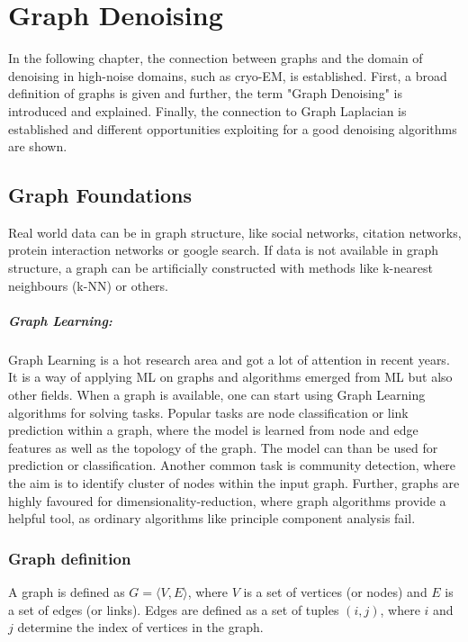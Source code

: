 \chapter{Graph Denoising}
\label{sec:graphDenoising}
    

In the following chapter, the connection between graphs and the domain of denoising in high-noise 
domains, such as cryo-EM, is established.
First, a broad definition of graphs is given and further, the term "Graph Denoising" is
introduced and explained. Finally, the connection to Graph Laplacian is established
and different opportunities exploiting for a good denoising algorithms are shown.


\section{Graph Foundations}
Real world data can be in graph structure, like social networks, citation networks,
protein interaction networks or google search. 
If data is not available in graph structure, a graph can be artificially constructed with methods like k-nearest neighbours (k-NN) or others.

\paragraph{Graph Learning:} Graph Learning is a hot research area and got a lot of attention in recent years.
It is a way of applying ML on graphs and algorithms emerged from ML but also other fields.
When a graph is available, one can start using Graph Learning algorithms for solving tasks.
Popular tasks are node classification or link prediction within a graph, where the model is learned from node and edge features 
as well as the topology of the graph. The model can than be used for prediction or classification.
Another common task is community detection, where the aim is to identify cluster of nodes within the input graph.
Further, graphs are highly favoured for dimensionality-reduction, where 
graph algorithms provide a helpful tool, as ordinary algorithms like principle component analysis fail.

\subsection{Graph definition}
A graph is defined as $G = \langle V,E \rangle$, where $V$ is a set of 
vertices (or nodes) and $E$ is a set of edges (or links). 
Edges are defined as a set of tuples $(i, j)$, where $i$ and $j$ determine 
the index of vertices in the graph.

